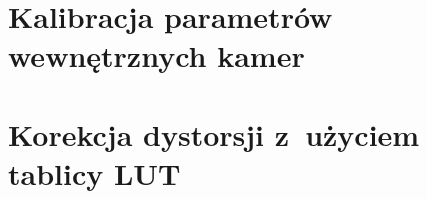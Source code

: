 \section{Kalibracja parametrów wewnętrznych kamer}
\label{sec:kalibracja-wewn}


\section{Korekcja dystorsji z~użyciem tablicy LUT}
\label{sec:lut}


